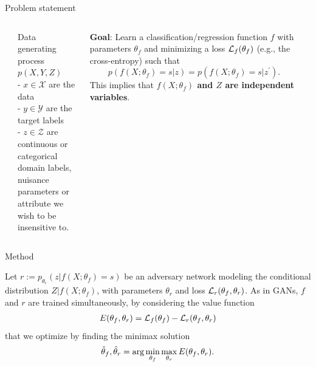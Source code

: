\documentclass[final,unknownkeysallowed]{beamer}
\begin{document}
\begin{frame}{}
\begin{textblock}{0.32}
\begin{block}{Problem statement \phantom{p}}
\begin{columns}[t]
\begin{column}{0.02\textwidth}
\end{column}
\begin{column}{0.48\textwidth}
Data generating process $p(X, Y, Z)$ \\
- $x \in \mathcal{X}$ are the data \\
- $y \in \mathcal{Y}$ are the target labels \\
- $z \in \mathcal{Z}$ are continuous or categorical \\
\hspace{1.2cm} domain labels, nuisance parameters or \\
\hspace{1.2cm} attribute we wish to be insensitive to.
\end{column}
\begin{column}{0.48\textwidth}
\textbf{\color{red} Goal}: Learn a classification/regression function $f$
with parameters $\theta_{f}$ and minimizing a loss ${\cal L}_f(\theta_f)$ (e.g., the cross-entropy) such that
$$p(f(X ; \theta_f) = s | z ) = p(f(X ; \theta_f) = s | z^\prime ).$$
This implies that {\color{blue}\bf $f(X ; \theta_f)$ and $Z$ are independent variables}.
\end{column}
\begin{column}{0.02\textwidth}
\end{column}
\end{columns}

\end{block}

\vspace{0.5cm}
\begin{block}{Method \phantom{p}}

Let $r := p_{\theta_r}(z | f(X;\theta_f)=s)$ be {\color{red} an adversary network} modeling the conditional distribution $Z|f(X;\theta_f)$, with
parameters $\theta_r$ and loss ${\cal L}_r(\theta_f, \theta_r)$. As in GANs, $f$ and $r$ are trained simultaneously, by considering the value function
\begin{align}
E(\theta_f, \theta_r) = {\cal L}_f(\theta_f) - {\cal L}_r(\theta_f, \theta_r)
\end{align}
that we optimize by finding the minimax solution
\begin{align}
\smash{\hat\theta_f, \hat\theta_r} = \arg \min_{\theta_f} \max_{\theta_r} E(\theta_f, \theta_r).
\end{align}


\end{block}
\end{textblock}
\end{frame}
\end{document}
